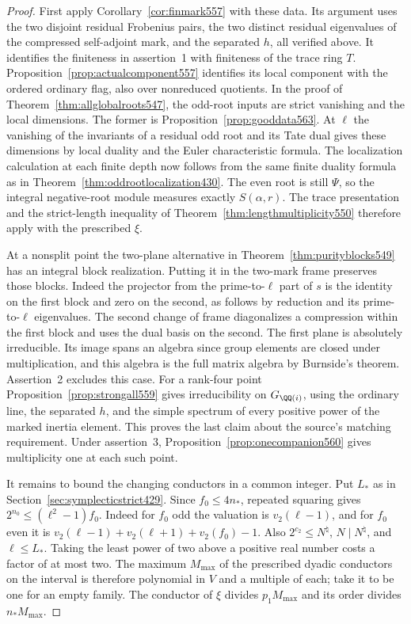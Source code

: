 \documentclass[a4paper,11pt]{article}
\theoremstyle{definition}
\theoremstyle{remark}
\numberwithin{equation}{section}
\begin{document}
\begin{proof}
First apply Corollary~\ref{cor:finmark557} with these data.
Its argument uses the two disjoint residual Frobenius pairs,
the two distinct residual eigenvalues of the compressed
self-adjoint mark, and the separated \(h\), all verified above.
It identifies the finiteness in assertion~1 with finiteness of
the trace ring \(T\). Proposition~\ref{prop:actualcomponent557}
identifies its local component with the ordered ordinary flag,
also over nonreduced quotients. In the proof of
Theorem~\ref{thm:allglobalroots547}, the odd-root inputs are
strict vanishing and the local dimensions. The former is
Proposition~\ref{prop:gooddata563}. At \(\ell\) the vanishing
of the invariants of a residual odd root and its Tate dual
gives these dimensions by local duality and the Euler
characteristic formula. The localization calculation at each
finite depth now follows from the same finite duality formula
as in Theorem~\ref{thm:oddrootlocalization430}. The even root
is still \(\Psi\), so the integral negative-root module measures
exactly \(S(\alpha,r)\). The trace presentation and the
strict-length inequality of Theorem~\ref{thm:lengthmultiplicity550}
therefore apply with the prescribed \(\xi\).

At a nonsplit point the two-plane alternative in
Theorem~\ref{thm:purityblocks549} has an integral block
realization. Putting it in the two-mark frame preserves those
blocks. Indeed the projector from the prime-to-\(\ell\) part
of \(s\) is the identity on the first block and zero on the
second, as follows by reduction and its prime-to-\(\ell\)
eigenvalues. The second change of frame diagonalizes a
compression within the first block and uses the dual basis on
the second. The first plane is absolutely irreducible. Its
image spans an algebra since group elements are closed under
multiplication, and this algebra is the full matrix algebra
by Burnside's theorem. Assertion~2 excludes this case.
For a rank-four point Proposition~\ref{prop:strongall559}
gives irreducibility on \(G_{\QQ(i)}\), using the ordinary
line, the separated \(h\), and the simple spectrum of every
positive power of the marked inertia element. This proves
the last claim about the source's matching requirement.
Under assertion~3, Proposition~\ref{prop:onecompanion560}
gives multiplicity one at each such point.

It remains to bound the changing conductors in a common
integer. Put \(L_*\) as in Section~\ref{sec:symplecticstrict429}.
Since \(f_0\le4n_*\), repeated squaring gives
\(2^{n_0}\le(\ell^2-1)f_0\). Indeed for \(f_0\) odd the
valuation is \(v_2(\ell-1)\), and for \(f_0\) even it is
\(v_2(\ell-1)+v_2(\ell+1)+v_2(f_0)-1\). Also
\(2^{c_2}\le N^\natural\), \(N\mid N^\natural\),
and \(\ell\le L_*\). Taking the least power of two above
a positive real number costs a factor of at most two.
The maximum \(M_{\max}\) of the prescribed dyadic conductors
on the interval is therefore polynomial in \(V\) and a multiple
of each; take it to be one for an empty family.
The conductor of \(\xi\) divides \(p_1 M_{\max}\) and its
order divides \(n_* M_{\max}\).


\end{proof}
\end{document}
